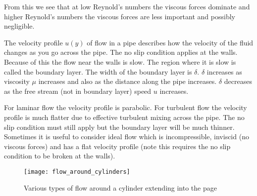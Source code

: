 \documentclass{article}
\begin{document}
    From this we see that at low Reynold's numbers the viscous forces dominate and higher Reynold's numbers the viscous forces are less important and possibly negligible.
    
    \begin{center}
    \end{center}
    The velocity profile \(u(y)\) of flow in a pipe describes how the velocity of the fluid changes as you go across the pipe.
    The no slip condition applies at the walls. Because of this the flow near the walls is slow. 
    The region where it is slow is called the boundary layer. 
    The width of the boundary layer is \(\delta\). 
    \(\delta\) increases as viscosity \(\mu\) increases and also as the distance along the pipe increases. 
    \(\delta\) decreases as the free stream (not in boundary layer) speed \(u\) increases.
    
    For laminar flow the velocity profile is parabolic.
    For turbulent flow the velocity profile is much flatter due to effective turbulent mixing across the pipe.
    The no slip condition must still apply but the boundary layer will be much thinner.
    Sometimes it is useful to consider ideal flow which is incompressible, inviscid (no viscous forces) and has a flat velocity profile (note this requires the no slip condition to be broken at the walls).
    
    \begin{figure}[ht]
        \centering
        \texttt{[image: flow\_around\_cylinders]}
        \caption{Various types of flow around a cylinder extending into the page}
        \label{fig:flow types}
    \end{figure}
\end{document}

